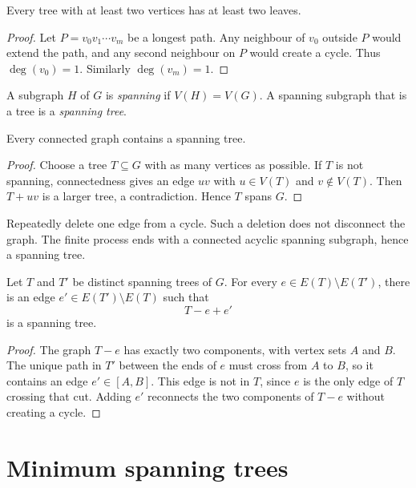 \begin{notecorollary}
Every tree with at least two vertices has at least two leaves.
\end{notecorollary}
\begin{proof}
Let $P=v_0v_1\cdots v_m$ be a longest path.  Any neighbour of $v_0$ outside $P$ would extend the path, and any second neighbour on $P$ would create a cycle.  Thus $\deg(v_0)=1$.  Similarly $\deg(v_m)=1$.
\end{proof}
\begin{notedefinition}
A subgraph $H$ of $G$ is \emph{spanning} if $V(H)=V(G)$.  A spanning subgraph that is a tree is a \emph{spanning tree}.
\end{notedefinition}

\begin{notetheorem}
Every connected graph contains a spanning tree.
\end{notetheorem}
\begin{proof}
Choose a tree $T\subseteq G$ with as many vertices as possible.  If $T$ is not spanning, connectedness gives an edge $uv$ with $u\in V(T)$ and $v\notin V(T)$.  Then $T+uv$ is a larger tree, a contradiction.  Hence $T$ spans $G$.
\end{proof}

\begin{noteremark}
Repeatedly delete one edge from a cycle.  Such a deletion does not disconnect the graph.  The finite process ends with a connected acyclic spanning subgraph, hence a spanning tree.
\end{noteremark}
\begin{notetheorem}
Let $T$ and $T'$ be distinct spanning trees of $G$.  For every $e\in E(T)\setminus E(T')$, there is an edge $e'\in E(T')\setminus E(T)$ such that
\[
  T-e+e'
\]
is a spanning tree.
\end{notetheorem}
\begin{proof}
The graph $T-e$ has exactly two components, with vertex sets $A$ and $B$.  The unique path in $T'$ between the ends of $e$ must cross from $A$ to $B$, so it contains an edge $e'\in[A,B]$.  This edge is not in $T$, since $e$ is the only edge of $T$ crossing that cut.  Adding $e'$ reconnects the two components of $T-e$ without creating a cycle.
\end{proof}
\section{Minimum spanning trees}

